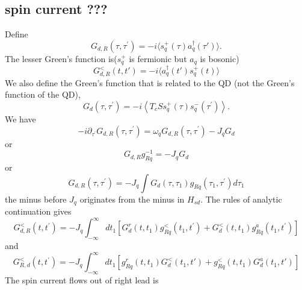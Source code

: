 \documentclass[aps,prb,onecolumn,amssymb,amsmath,superscriptaddress]{revtex4-1}
\begin{document}
\subsection{spin current ???}
Define
\begin{equation}
G_{d, R}\left(\tau, \tau^{\prime}\right)=-i\langle s_{q}^{+}(\tau) a_{q}^{\dag}(\tau')\rangle.
\end{equation}
The lesser Green's function is($s_{q}^{+}$ is fermionic but $a_{q}$ is bosonic)
\begin{equation}
G_{d, R}^{<}\left(t, t'\right)=-i\langle  a_{q}^{\dag}(t') s_{q}^{+}(t) \rangle
\end{equation}
We also define the Green’s function that is related to the QD (not the Green’s function of the QD),
\begin{equation}
G_{d}\left(\tau, \tau^{\prime}\right)= -i\left\langle T_{c} S s_{q}^{+}(\tau) s_{q}^{-}\left(\tau^{\prime}\right)\right\rangle .
\end{equation}
We have
\begin{equation}
-i \partial_{\tau^{\prime}} G_{d, R}\left(\tau, \tau^{\prime}\right)=\omega_{q} G_{d, R}\left(\tau, \tau^{\prime}\right)-J_{q} G_{d}
\end{equation}
or
\begin{equation}
G_{d, R} g_{R q}^{-1}=-J_{q} G_{d}
\end{equation}
or
\begin{equation}
G_{d, R}\left(\tau, \tau^{\prime}\right)=-J_{q} \int G_{d}\left(\tau, \tau_{1}\right) g_{R q}\left(\tau_{1}, \tau^{\prime}\right) d \tau_{1}
\end{equation}
the minus before $J_{q}$ originates from the minus in $H_{sd}$. The rules of analytic continuation gives
\begin{equation}
G_{d, R}^{<}\left(t, t^{\prime}\right)=-J_{q} \int_{-\infty}^{\infty}dt_{1} [G_{d}^{r}\left(t, t_{1}\right) g_{R q}^{<}\left(t_{1}, t^{\prime}\right) + G_{d}^{<}\left(t, t_{1}\right) g_{R q}^{a}\left(t_{1}, t^{\prime}\right)]
\end{equation}
and
\begin{equation}
G_{R,d}^{<}\left(t, t^{\prime}\right)=-J_{q} \int_{-\infty}^{\infty}dt_{1} [g_{R q}^{r}\left(t, t_{1}\right) G_{d}^{<}\left(t_{1}, t'\right)  + g_{R q}^{<}\left(t, t_{1}\right) G_{d}^{a}\left(t_{1}, t'\right)]
\end{equation}
The spin current flows out of right lead is
\end{document}
